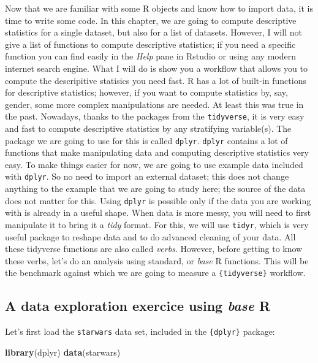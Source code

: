 \documentclass[]{gitbook}
\newenvironment{Shaded}{\begin{snugshade}}{\end{snugshade}}
\newcommand{\KeywordTok}[1]{\textcolor[rgb]{0.13,0.29,0.53}{\textbf{#1}}}
\newcommand{\NormalTok}[1]{#1}
\begin{document}
Now that we are familiar with some R objects and know how to import data, it is time to write some
code. In this chapter, we are going to compute descriptive statistics for a single dataset, but
also for a list of datasets. However, I will not give a list of functions to compute descriptive
statistics; if you need a specific function you can find easily in the \emph{Help} pane in Rstudio or
using any modern internet search engine. What I will do is show you a workflow that allows you to
compute the descripitive statisics you need fast.
R has a lot of built-in functions for descriptive statistics; however, if you want to compute
statistics by, say, gender, some more complex manipulations are needed. At least this was true in
the past. Nowadays, thanks to the packages from the \texttt{tidyverse}, it is very easy and fast to
compute descriptive statistics by any stratifying variable(s). The package we are going to use for
this is called \texttt{dplyr}. \texttt{dplyr} contains a lot of functions that make manipulating
data and computing descriptive statistics very easy. To make things easier for now, we are going to
use example data included with \texttt{dplyr}. So no need to import an external dataset; this does not
change anything to the example that we are going to study here; the source of the data does not
matter for this. Using \texttt{dplyr} is possible only if the data you are working with is already in
a useful shape. When data is more messy, you will need to first manipulate it to bring it a \emph{tidy}
format. For this, we will use \texttt{tidyr}, which is very useful package to reshape data and to do
advanced cleaning of your data.
All these tidyverse functions are also called \emph{verbs}. However, before getting to know these verbs,
let's do an analysis using standard, or \emph{base} R functions. This will be the benchmark against
which we are going to measure a \texttt{\{tidyverse\}} workflow.

\hypertarget{a-data-exploration-exercice-using-base-r}{%
\subsection{\texorpdfstring{A data exploration exercice using \emph{base} R}{A data exploration exercice using base R}}\label{a-data-exploration-exercice-using-base-r}}

Let's first load the \texttt{starwars} data set, included in the \texttt{\{dplyr\}} package:

\begin{Shaded}
\begin{Highlighting}[]
\KeywordTok{library}\NormalTok{(dplyr)}
\KeywordTok{data}\NormalTok{(starwars)}
\end{Highlighting}
\end{Shaded}
\end{document}
